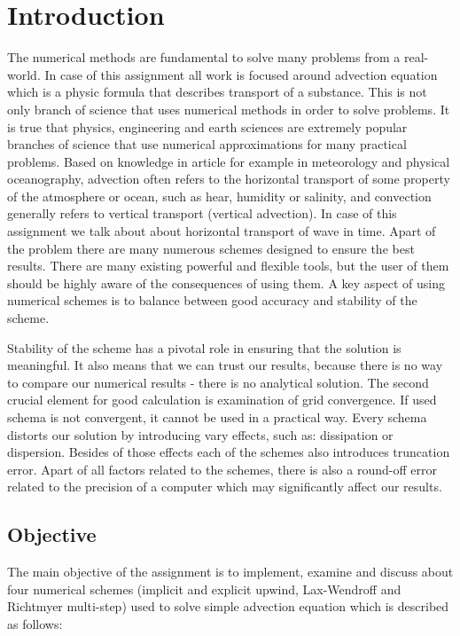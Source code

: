 \chapter{Introduction} \label{sec:Intoduction}
	The numerical methods are fundamental to solve many problems from a real-world. In case of this assignment all work is focused around advection equation which is a physic formula that describes transport of a substance. This is not only branch of science that uses numerical methods in order to solve problems. It is true that physics, engineering and earth sciences are extremely popular branches of science that use numerical approximations for many practical problems. Based on knowledge in article \cite{bib:advection} for example in meteorology and physical oceanography, advection often refers to the horizontal transport of some property of the atmosphere or ocean, such as hear, humidity or salinity, and convection generally refers to vertical transport (vertical advection). In case of this assignment we talk about about horizontal transport of wave in time. Apart of the problem there are many numerous schemes designed to ensure the best results. There are many existing powerful and flexible tools, but the user of them should be highly aware of the consequences of using them. A key aspect of using numerical schemes is to balance between good accuracy and stability of the scheme.
	
	Stability of the scheme has a pivotal role in ensuring that the solution is meaningful. It also means that we can trust our results, because there is no way to compare our numerical results - there is no analytical solution. The second crucial element for good calculation is examination of grid convergence. If used schema is not convergent, it cannot be used in a practical way. Every schema distorts our solution by introducing vary effects, such as: dissipation or dispersion. Besides of those effects each of the schemes also introduces truncation error. Apart of all factors related to the schemes, there is also a round-off error related to the precision of a computer which may significantly affect our results.
	
	\section{Objective} \label{sec:Objective}
		The main objective of the assignment is to implement, examine and discuss about four numerical schemes (implicit and explicit upwind, Lax-Wendroff and Richtmyer multi-step) used to solve simple advection equation which is described as follows:
		
